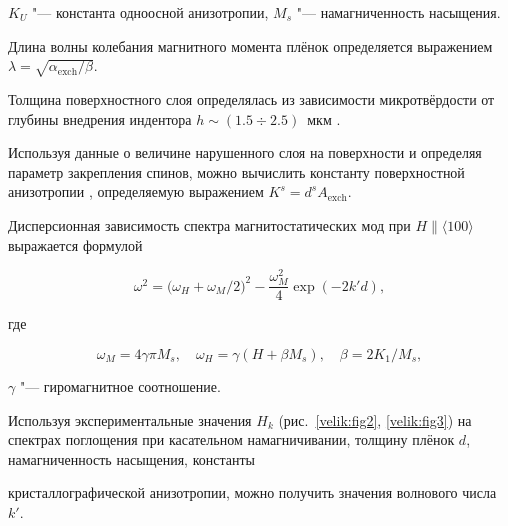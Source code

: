 $K_U$ "--- константа одноосной анизотропии, $M_s$ "--- намагниченность насыщения. 

Длина волны колебания магнитного момента плёнок определяется выражением $\lambda = \sqrt{{\alpha_\text{exch}}/{\beta}}$.



Толщина поверхностного слоя определялась из зависимости микротвёрдости от глубины внедрения индентора $h \sim (1.5\div2.5)$~мкм \cite{velik:M3}.

Используя данные о величине нарушенного слоя на поверхности и определяя параметр закрепления спинов, можно вычислить константу поверхностной анизотропии \cite{velik:M10}, определяемую выражением $K^s = d^sA_\text{exch}$.



\smallskip




Дисперсионная зависимость спектра магнитостатических мод при $H\|\langle100\rangle$ выражается формулой

\cite{velik:M11}

\begin{equation}

\label{velik:eq1}

\omega^2=\bigl(\omega_H+\omega_M/2\bigr)^2-\frac{\omega^2_M}{4}\exp(-2k'd),

\end{equation}

где 

$$\omega_M = 4\gamma\pi M_s,\quad 

\omega_H=\gamma(H + \beta {M_s}), \quad \beta= 2K_1/M_s,$$ 

$\gamma$ "--- гиромагнитное соотношение. 

Используя экспериментальные значения $H_k$ (рис.~\ref{velik:fig2}, \ref{velik:fig3}) на спектрах поглощения при касательном намагничивании, толщину плёнок $d$, намагниченность насыщения, константы

кристаллографической анизотропии, можно получить значения волнового числа $k'$.





